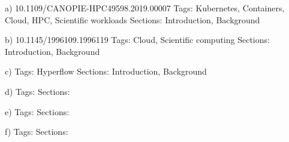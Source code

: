 a) 10.1109/CANOPIE-HPC49598.2019.00007 %
%
Tags: Kubernetes, Containers, Cloud, HPC, Scientific workloads
%
Sections: Introduction, Background

b) 10.1145/1996109.1996119 %
%
Tags: Cloud, Scientific computing
%
Sections: Introduction, Background

c) %
%
Tags: Hyperflow
%
Sections: Introduction, Background

d) 
%
Tags: 
%
Sections: 

e) 
%
Tags: 
%
Sections: 

f) 
%
Tags: 
%
Sections: 
